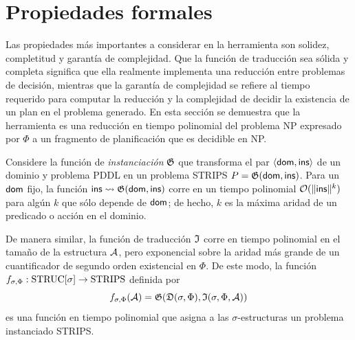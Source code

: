

\section{Propiedades formales}
Las propiedades más importantes a considerar en la herramienta son solidez,
completitud y garantía de complejidad. Que la función de traducción sea sólida
y completa significa que ella realmente implementa una reducción entre problemas de
decisión, mientras que la garantía de complejidad se refiere al tiempo
requerido para computar la reducción y la complejidad de decidir la existencia
de un plan en el problema generado. En esta sección se demuestra que la 
herramienta es una reducción en tiempo
polinomial del problema NP expresado por $\Phi$ a un fragmento de planificación
que es decidible en NP.

Considere la función de \emph{instanciación} $\mathfrak{G}$ que transforma el par
$\langle \mathsf{dom},\mathsf{ins} \rangle$ de un dominio y problema PDDL en un problema STRIPS
$P = \mathfrak{G}(\mathsf{dom}, \mathsf{ins})$. Para un $\mathsf{dom}$ fijo, la función
$\mathsf{ins}\leadsto\mathfrak{G}(\mathsf{dom}, \mathsf{ins})$ corre en un tiempo polinomial
$\mathcal{O}(\|\mathsf{ins}\|^k)$ para algún $k$ que sólo depende de $\mathsf{dom}$; de hecho,
$k$ es la máxima aridad de un predicado o acción en el dominio.

De manera similar, la función de traducción $\mathfrak{I}$ corre en tiempo
polinomial en el tamaño de la estructura $\mathcal{A}$, pero exponencial sobre la aridad
más grande de un cuantificador de segundo orden existencial en $\Phi$. De este
modo, la función $f_{\sigma,\Phi}:\text{STRUC}[\sigma]\rightarrow\text{STRIPS}$
definida por 
\[ f_{\sigma,\Phi}(\mathcal{A}) = \mathfrak{G}(\mathfrak{D}(\sigma,\Phi),\mathfrak{I}(\sigma,\Phi,\mathcal{A})) \]
es una función en tiempo polinomial que asigna a las $\sigma$-estructuras un
problema instanciado STRIPS.

